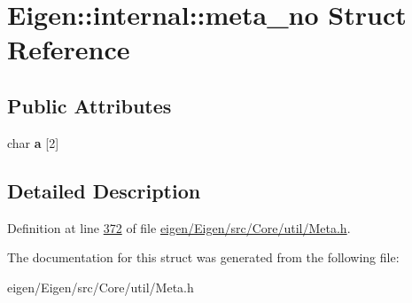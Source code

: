 \hypertarget{struct_eigen_1_1internal_1_1meta__no}{}\section{Eigen\+:\+:internal\+:\+:meta\+\_\+no Struct Reference}
\label{struct_eigen_1_1internal_1_1meta__no}
\subsection*{Public Attributes}
\begin{DoxyCompactItemize}
\item 
\mbox{\label{struct_eigen_1_1internal_1_1meta__no_ac26e6653b9b27d2c7a7b8077cf21e354}} 
char {\bfseries a} \mbox{[}2\mbox{]}
\end{DoxyCompactItemize}


\subsection{Detailed Description}


Definition at line \hyperlink{eigen_2_eigen_2src_2_core_2util_2_meta_8h_source_l00372}{372} of file \hyperlink{eigen_2_eigen_2src_2_core_2util_2_meta_8h_source}{eigen/\+Eigen/src/\+Core/util/\+Meta.\+h}.



The documentation for this struct was generated from the following file\+:\begin{DoxyCompactItemize}
\item 
eigen/\+Eigen/src/\+Core/util/\+Meta.\+h\end{DoxyCompactItemize}
